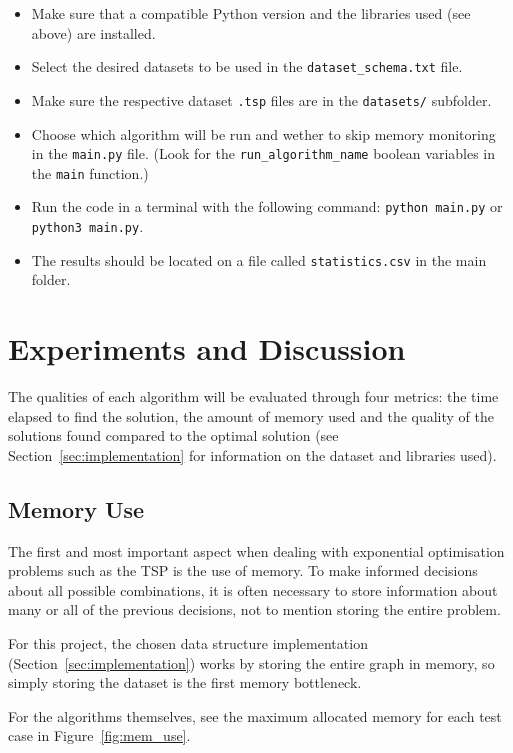\documentclass[12pt]{article}
\begin{document}
\begin{itemize}
  \item Make sure that a compatible Python version and the libraries used (see above) are installed.
  \item Select the desired datasets to be used in the \texttt{dataset\_schema.txt} file.
  \item Make sure the respective dataset \texttt{.tsp} files are in the \texttt{datasets/} subfolder.
  \item Choose which algorithm will be run and wether to skip memory monitoring in the \texttt{main.py} file. (Look for the \texttt{run\_algorithm\_name} boolean variables in the \texttt{main} function.)
  \item Run the code in a terminal with the following command: \texttt{python main.py} or \texttt{python3 main.py}.
  \item The results should be located on a file called \texttt{statistics.csv} in the main folder.
\end{itemize}

\section{Experiments and Discussion} \label{sec:experiments}

The qualities of each algorithm will be evaluated through four metrics: the time elapsed 
to find the solution, the amount of memory used and the quality of the solutions found 
compared to the optimal solution (see Section~\ref{sec:implementation} for information 
on the dataset and libraries used).

\subsection{Memory Use} \label{sec:exp_memory}

The first and most important aspect when dealing with exponential optimisation problems such as 
the TSP is the use of memory. To make informed decisions about all possible combinations, 
it is often necessary to store information about many or all of the previous decisions, not to 
mention storing the entire problem.

For this project, the chosen data structure implementation (Section~\ref{sec:implementation}) works by storing 
the entire graph in memory, so simply storing the dataset is the first memory bottleneck.

For the algorithms themselves, see the maximum allocated memory for each test case in Figure~\ref{fig:mem_use}.
\end{document}
